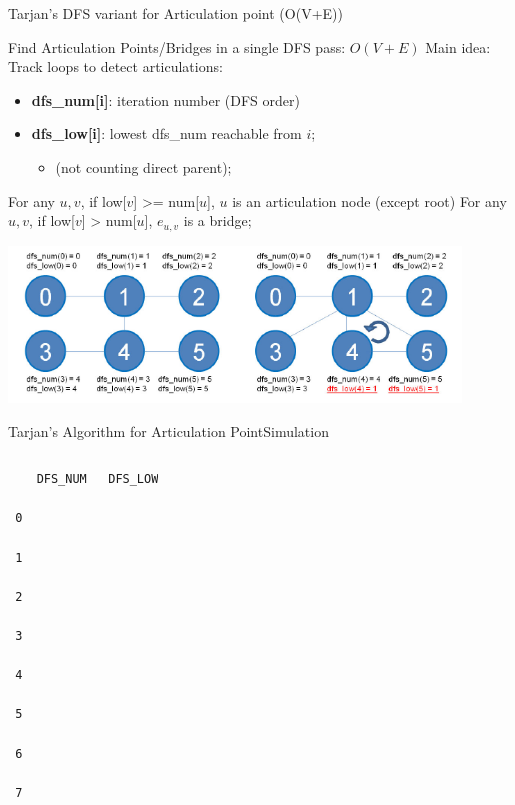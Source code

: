 \begin{frame}{Tarjan's DFS variant for Articulation point (O(V+E))}
  \begin{exampleblock}{Find Articulation Points/Bridges in a single DFS pass: $O(V+E)$}
    Main idea: Track loops to detect articulations:
    \begin{itemize}
    \item {\bf dfs\_num[i]}: iteration number (DFS order)
    \item {\bf dfs\_low[i]}: lowest dfs\_num reachable from $i$;
      \begin{itemize}
        \item (not counting direct parent);
      \end{itemize}
    \end{itemize}
    For any $u,v$, if low[$v$] >= num[$u$], $u$ is an articulation node (except root)
    For any $u,v$, if low[$v$] > num[$u$], $e_{u,v}$ is a bridge;
  \end{exampleblock}
  \begin{center}
    \includegraphics[width=0.9\textwidth]{../img/graph_articulation}
  \end{center}
\end{frame}

\begin{frame}[fragile]{Tarjan's Algorithm for Articulation Point}{Simulation}

  \begin{columns}
{\smaller
\begin{verbatim}
    DFS_NUM   DFS_LOW

 0

 1

 2

 3

 4

 5

 6

 7
\end{verbatim}}
  \end{columns}
\end{frame}


